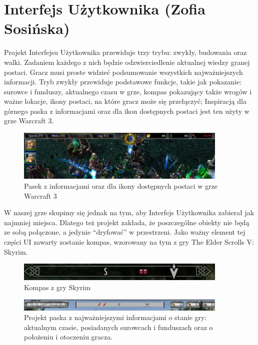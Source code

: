 \section{Interfejs Użytkownika (Zofia Sosińska)}\label{chap:ui}

Projekt Interfejsu Użytkownika przewiduje trzy trybu: zwykły, budowania oraz walki. Zadaniem każdego z nich będzie odzwierciedlenie aktualnej wiedzy granej postaci. Gracz musi proste widzieć podsumowanie wszystkich najważniejszych informacji.
	Tryb zwykły przewiduje podstawowe funkcje, takie jak pokazanie:
surowce i funduszy,
aktualnego czasu w grze, 
kompas pokazujący także wrogów i ważne lokacje,
ikony postaci, na które gracz może się przełączyć;
Inspiracją dla górnego paska z informacjami  oraz dla ikon dostępnych postaci jest ten użyty w grze Warcraft 3.

\begin{figure}[htbp]
    \centering
    \includegraphics[width=0.9\textwidth]{images/ui/warcraft3.png}
    \caption{Pasek z informacjami oraz dla ikony dostępnych postaci w grze Warcraft 3}\label{fig:Warcraft3}
\end{figure}

W naszej grze skupimy się jednak na tym, aby Interfejs Użytkownika zabierał jak najmniej miejsca. Dlatego też projekt zakłada, że poszczególne obiekty nie będą ze sobą połączone, a jedynie “dryfować” w przestrzeni.
Jako ważny element tej części UI zawarty zostanie kompas, wzorowany na tym z gry The Elder Scrolls V: Skyrim.

\begin{figure}[htbp]
    \centering
    \includegraphics[width=0.9\textwidth]{images/ui/compassSkyrim.png}
    \caption{Kompas z gry Skyrim}\label{fig:Fallout}
\end{figure}


\begin{figure}[htbp]
    \centering
    \includegraphics[width=0.9\textwidth]{images/ui/naszpasek.png}
    \caption{Projekt paska z najważniejszymi informacjami o stanie gry: aktualnym czasie, posiadanych surowcach i funduszach oraz o położeniu i otoczeniu gracza.
    }\label{fig:compass}
\end{figure}
 

